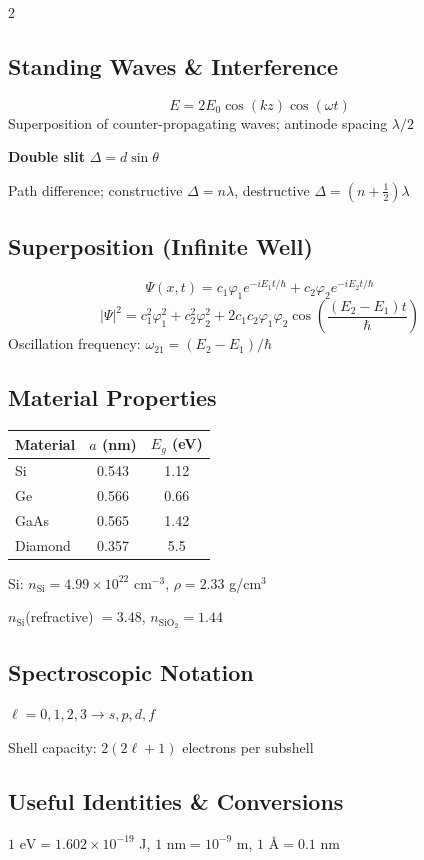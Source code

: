 \documentclass[9pt]{extarticle}
\newcommand{\eqlabel}[1]{\textbf{\scriptsize #1}\;}
\newcommand{\desc}[1]{{\small\color{desc}#1}}
\begin{document}
\begin{multicols}{2}
\subsection{Standing Waves \& Interference}
\[E = 2E_0\cos(kz)\cos(\omega t)\]
\desc{Superposition of counter-propagating waves; antinode spacing $\lambda/2$}

\eqlabel{Double slit} $\Delta = d\sin\theta$

\desc{Path difference; constructive $\Delta = n\lambda$, destructive $\Delta = (n+\tfrac{1}{2})\lambda$}

\subsection{Superposition (Infinite Well)}
\[\Psi(x,t) = c_1\varphi_1 e^{-iE_1t/\hbar} + c_2\varphi_2 e^{-iE_2t/\hbar}\]
\[|\Psi|^2 = c_1^2\varphi_1^2 + c_2^2\varphi_2^2 + 2c_1c_2\varphi_1\varphi_2\cos\!\left(\frac{(E_2-E_1)t}{\hbar}\right)\]
\desc{Oscillation frequency: $\omega_{21} = (E_2 - E_1)/\hbar$}

\subsection{Material Properties}
\renewcommand{\arraystretch}{1.15}
\begin{tabular}{@{}l c c@{}}
\toprule
Material & $a$ (nm) & $E_g$ (eV) \\
\midrule
Si & 0.543 & 1.12 \\
Ge & 0.566 & 0.66 \\
GaAs & 0.565 & 1.42 \\
Diamond & 0.357 & 5.5 \\
\bottomrule
\end{tabular}
\renewcommand{\arraystretch}{1.0}

\smallskip
Si: $n_{\text{Si}} = 4.99\times10^{22}$ cm$^{-3}$, $\rho = 2.33$ g/cm$^3$

$n_{\text{Si}}$(refractive) $= 3.48$, \; $n_{\text{SiO}_2} = 1.44$

\subsection{Spectroscopic Notation}
$\ell = 0,1,2,3 \to s,p,d,f$

Shell capacity: $2(2\ell+1)$ electrons per subshell

\subsection{Useful Identities \& Conversions}
$1\text{ eV} = 1.602\times10^{-19}$ J, \; $1\text{ nm} = 10^{-9}$ m, \; $1\text{ \AA} = 0.1\text{ nm}$


\end{multicols}
\end{document}
